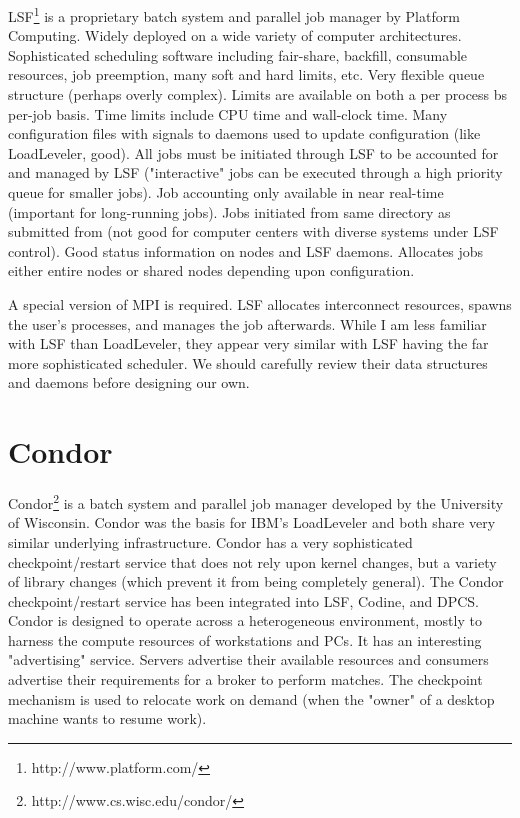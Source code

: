 \documentclass{article}
\begin{document}
LSF\footnote{http://www.platform.com/}
is a proprietary batch system and parallel job manager by
Platform Computing. Widely deployed on a wide variety of computer
architectures. Sophisticated scheduling software including
fair-share, backfill, consumable resources, job preemption, many soft
and hard limits, etc. Very flexible queue structure (perhaps overly
complex). Limits are available on both a per process bs per-job
basis. Time limits include CPU time and wall-clock time. Many
configuration files with signals to daemons used to update
configuration (like LoadLeveler, good). All jobs must be initiated
through LSF to be accounted for and managed by LSF ("interactive"
jobs can be executed through a high priority queue for
smaller jobs). Job accounting only available in near real-time (important
for long-running jobs). Jobs initiated from same directory as
submitted from (not good for computer centers with diverse systems
under LSF control). Good status information on nodes and LSF daemons.
Allocates jobs either entire nodes or shared nodes depending upon
configuration.

A special version of MPI is required. LSF allocates interconnect
resources, spawns the user's processes, and manages the job
afterwards. While I am less familiar with LSF than LoadLeveler, they
appear very similar with LSF having the far more sophisticated
scheduler. We should carefully review their data structures and
daemons before designing our own.


\section{Condor}


Condor\footnote{http://www.cs.wisc.edu/condor/} is a
batch system and parallel job manager
developed by the University of Wisconsin.
Condor was the basis for IBM's LoadLeveler and both share very similar
underlying infrastructure. Condor has a very sophisticated checkpoint/restart
service that does not rely upon kernel changes, but a variety of
library changes (which prevent it from being completely general). The
Condor checkpoint/restart service has been integrated into LSF,
Codine, and DPCS. Condor is designed to operate across a
heterogeneous environment, mostly to harness the compute resources of
workstations and PCs. It has an interesting "advertising" service.
Servers advertise their available resources and consumers advertise
their requirements for a broker to perform matches. The checkpoint
mechanism is used to relocate work on demand (when the "owner" of a
desktop machine wants to resume work).
\end{document}
